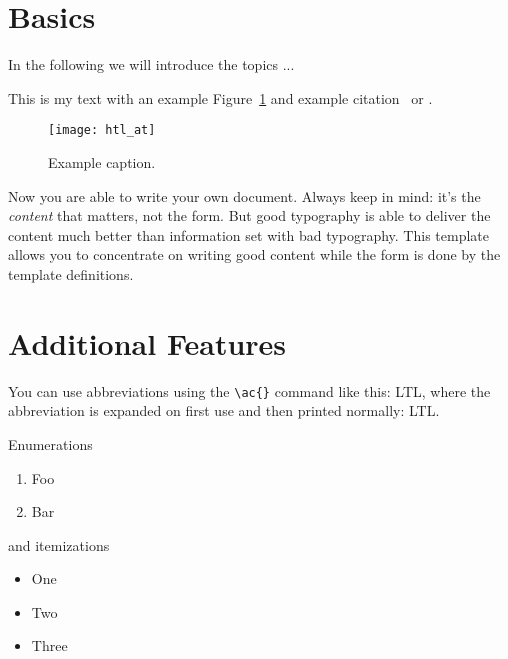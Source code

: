 



\section{Basics}
In the following we will  introduce the topics ... 

This is my text with an example Figure~\ref{fig:example} and example
citation~\cite{Bringhurst1993} or \textcite{Bringhurst1993}. 

\begin{figure}
	\centering
	\texttt{[image: htl\_at]}
	\caption{Example caption.}
	\label{fig:example}
\end{figure}

Now you are able to write your own document. Always keep in mind: it's
the \emph{content} that matters, not the form. But good typography is
able to deliver the content much better than information set with bad
typography. This template allows you to concentrate on writing good
content while the form is done by the template definitions.

\section{Additional Features}

You can use abbreviations using the \verb+\ac{}+ command like this: \ac{LTL}, 
where the abbreviation is expanded on first use and then printed normally: \ac{LTL}. 

Enumerations
\begin{enumerate}
	\item Foo
	\item Bar
\end{enumerate}

and itemizations
\begin{itemize}
	\item One
	\item Two
	\item Three
\end{itemize}

